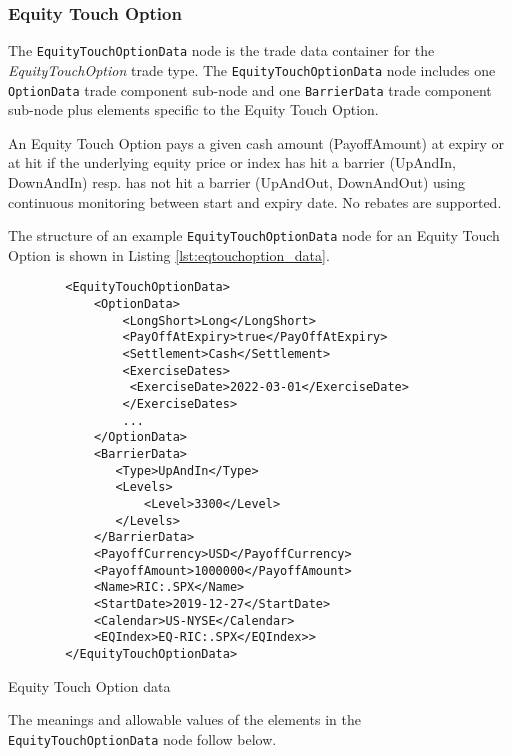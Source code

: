 \subsubsection{Equity Touch Option}

The \lstinline!EquityTouchOptionData!  node is the trade data container for the \emph{EquityTouchOption} trade type. The
\lstinline!EquityTouchOptionData!  node includes one  \lstinline!OptionData! trade component sub-node and one \lstinline!BarrierData! trade component sub-node plus elements
specific to the Equity Touch Option. 

An Equity Touch Option pays a given cash amount (PayoffAmount) at expiry or at hit if the underlying equity price or index has hit a barrier (UpAndIn, DownAndIn) resp. has not hit a barrier (UpAndOut, DownAndOut) using continuous monitoring between start and expiry date. No rebates are supported. 

The structure of an example \lstinline!EquityTouchOptionData! node for an Equity Touch Option is shown in Listing
\ref{lst:eqtouchoption_data}.

\begin{listing}[H]
\begin{verbatim}
        <EquityTouchOptionData>
            <OptionData>
                <LongShort>Long</LongShort>
                <PayOffAtExpiry>true</PayOffAtExpiry>
                <Settlement>Cash</Settlement>
                <ExerciseDates>
                 <ExerciseDate>2022-03-01</ExerciseDate>
                </ExerciseDates>                                
                ...
            </OptionData>
            <BarrierData>
               <Type>UpAndIn</Type>
               <Levels>
                   <Level>3300</Level>
               </Levels>
            </BarrierData>
            <PayoffCurrency>USD</PayoffCurrency>
            <PayoffAmount>1000000</PayoffAmount>
            <Name>RIC:.SPX</Name>
            <StartDate>2019-12-27</StartDate>
            <Calendar>US-NYSE</Calendar>
            <EQIndex>EQ-RIC:.SPX</EQIndex>>
        </EquityTouchOptionData>
\end{verbatim}
\caption{Equity Touch Option data}
\label{lst:eqtouchoption_data}
\end{listing}

The meanings and allowable values of the elements in the \lstinline!EquityTouchOptionData!  node follow below.

